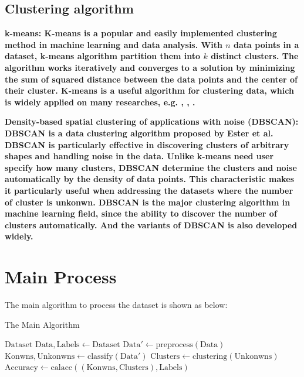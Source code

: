 \documentclass[twocolumn,10pt]{article}
\begin{document}
\subsection*{Clustering algorithm}

\bf{k-means}: \rm{K-means} is a popular and easily implemented clustering method in machine learning and 
data analysis. With $n$ data points in a dataset, k-means algorithm partition them into $k$ distinct 
clusters. The algorithm works iteratively and converges to a solution by minimizing the sum of squared 
distance between the data points and the center of their cluster. K-means is a useful algorithm for 
clustering data, which is widely applied on many researches, e.g. \cite{oyelade2010application}, 
\cite{NIDHEESH2017213}, \cite{kadhm2018accurate}.

\bf{Density-based spatial clustering of applications with noise (DBSCAN)}: \rm{DBSCAN} is a data clustering 
algorithm proposed by Ester et al. \cite{10.5555/3001460.3001507} DBSCAN is particularly effective in 
discovering clusters of arbitrary shapes and handling noise in the data. Unlike k-means need user specify 
how many clusters, DBSCAN determine the clusters and noise automatically by the density of data points. 
This characteristic makes it particularly useful when addressing the datasets where the number of cluster 
is unkonwn. DBSCAN is the major clustering algorithm in machine learning field, since the ability to 
discover the number of clusters automatically. And the variants of DBSCAN \cite{6814687} is also developed widely. 

\section{Main Process}
  The main algorithm to process the dataset is shown as below:
  \begin{algorithm}
    \caption{The Main Algorithm}\label{alg:main}
    \begin{algorithmic}[1]
      \Require $\text{Dataset}$
      \State $\text{Data}, \text{Labels} \gets \text{Dataset}$
      \State $\text{Data}' \gets \text{preprocess}(\text{Data})$
      \State $\text{Konwns}, \text{Unkonwns} \gets \text{classify}(\text{Data}')$
      \State $\text{Clusters} \gets \text{clustering}(\text{Unkonwns})$
      \State $\text{Accuracy} \gets \text{calacc}((\text{Konwns}, \text{Clusters}), \text{Labels})$
    \end{algorithmic}
  \end{algorithm}
\end{document}

